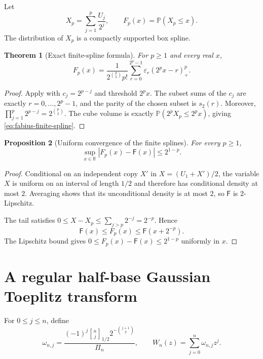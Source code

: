 \documentclass[11pt,oneside,openany]{book}
\newtheorem{theorem}{Theorem}[chapter]
\newtheorem{proposition}[theorem]{Proposition}
\theoremstyle{definition}
\theoremstyle{remark}
\newcommand{\Qbinom}[3]{\genfrac{[}{]}{0pt}{}{#1}{#2}_{#3}}
\newcommand{\eps}{\varepsilon}
\newcommand{\R}{\mathbb R}
\newcommand{\Prob}{\mathbb P}
\newcommand{\Fab}{\mathsf F}
\begin{document}
Let
\begin{equation}\label{eq:fabius-Xp}
 X_p=\sum_{j=1}^p\frac{U_j}{2^j},
 \qquad
 F_p(x)=\Prob(X_p\le x).
\end{equation}
The distribution of $X_p$ is a compactly supported box spline.

\begin{theorem}[Exact finite-spline formula]\label{thm:fabius-finite-spline}
For $p\ge1$ and every real $x$,
\begin{equation}\label{eq:fabius-finite-spline}
 \boxed{
 F_p(x)=\frac1{2^{\binom p2}p!}
 \sum_{r=0}^{2^p-1}\eps_r(2^px-r)_+^p.}
\end{equation}
\end{theorem}

\begin{proof}
Apply  with
$c_j=2^{p-j}$ and threshold $2^px$.  The subset sums of the $c_j$ are exactly
$r=0,\ldots,2^p-1$, and the parity of the chosen subset is $s_2(r)$.
Moreover,
$\prod_{j=1}^p2^{p-j}=2^{\binom p2}$.  The cube volume is exactly
$\Prob(2^pX_p\le2^px)$, giving \eqref{eq:fabius-finite-spline}.
\end{proof}

\begin{proposition}[Uniform convergence of the finite splines]\label{prop:fabius-spline-convergence}
For every $p\ge1$,
\begin{equation}\label{eq:fabius-spline-error}
 \sup_{x\in\R}|F_p(x)-\Fab(x)|\le2^{1-p}.
\end{equation}
\end{proposition}

\begin{proof}
Conditional on an independent copy $X'$ in
$X=(U_1+X')/2$, the variable $X$ is uniform on an interval of length $1/2$
and therefore has conditional density at most $2$.  Averaging shows that its
unconditional density is at most $2$, so $\Fab$ is $2$-Lipschitz.

The tail satisfies
$0\le X-X_p\le\sum_{j>p}2^{-j}=2^{-p}$.  Hence
\[
 \Fab(x)\le F_p(x)\le\Fab(x+2^{-p}).
\]
The Lipschitz bound gives
$0\le F_p(x)-\Fab(x)\le2^{1-p}$ uniformly in $x$.
\end{proof}

\section{A regular half-base Gaussian Toeplitz transform}

For $0\le j\le n$, define
\begin{equation}\label{eq:fabius-Toeplitz-weights}
 \omega_{n,j}=
 \frac{(-1)^j\Qbinom nj{1/2}2^{-\binom{j+1}{2}}}{\Pi_n},
 \qquad
 W_n(z)=\sum_{j=0}^n\omega_{n,j}z^j.
\end{equation}
\end{document}
